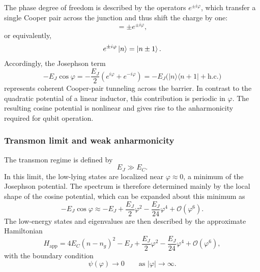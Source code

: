 The phase degree of freedom is described by the operators \(e^{\pm i\varphi}\), which transfer a single Cooper pair across the junction and thus shift the charge by one:
\begin{equation}
    [n, e^{\pm i\varphi}] = \pm e^{\pm i\varphi},
\end{equation}
or equivalently,
\begin{equation}
    e^{\pm i\varphi}\ket{n} = \ket{n \pm 1}.
\end{equation}
Accordingly, the Josephson term
\begin{equation}
    -E_J \cos\varphi
    = -\frac{E_J}{2}\left(e^{i\varphi}+e^{-i\varphi}\right) = -E_J\big(|n\rangle\langle n+1| + \text{h.c.}\big)
\end{equation}
represents coherent Cooper-pair tunneling across the barrier. In contrast to the quadratic potential of a linear inductor, this contribution is periodic in \(\varphi\). The resulting cosine potential is nonlinear and gives rise to the anharmonicity required for qubit operation.

\subsubsection{Transmon limit and weak anharmonicity}

The transmon regime is defined by
\begin{equation}
    E_J \gg E_C .
\end{equation}
In this limit, the low-lying states are localized near \(\varphi \approx 0\), a minimum of the Josephson potential. The spectrum is therefore determined mainly by the local shape of the cosine potential, which can be expanded about this minimum as
\begin{equation}
    -E_J\cos\varphi
    \approx
    -E_J
    + \frac{E_J}{2}\varphi^2
    - \frac{E_J}{24}\varphi^4
    + \mathcal{O}(\varphi^6).
\end{equation}
The low-energy states and eigenvalues are then described by the approximate Hamiltonian
\begin{equation}
    H_{\mathrm{app}}
    =
    4E_C(n-n_g)^2
    - E_J
    + \frac{E_J}{2}\varphi^2
    - \frac{E_J}{24}\varphi^4
    + \mathcal{O}(\varphi^6),
\end{equation}
with the boundary condition
\begin{equation}
    \psi(\varphi)\to 0
    \qquad \text{as } |\varphi|\to\infty .
\end{equation}

